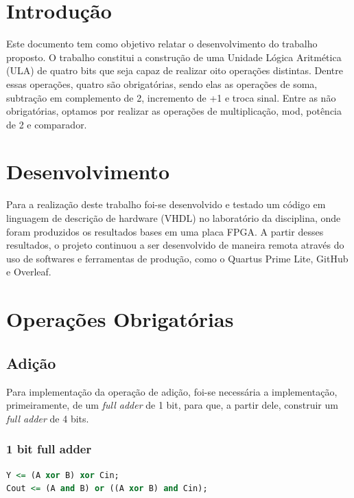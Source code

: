 \documentclass[a4paper, 12pt]{article}
\begin{document}
\newpage
{}

\section{Introdução}

Este documento tem como objetivo relatar o desenvolvimento do trabalho proposto. O trabalho constitui a construção de uma Unidade Lógica Aritmética (ULA) de quatro bits que seja capaz de realizar oito operações distintas. Dentre essas operações, quatro são obrigatórias, sendo elas as operações de soma, subtração em complemento de 2, incremento de +1 e troca sinal. Entre as não obrigatórias, optamos por realizar as operações de multiplicação, mod, potência de 2 e comparador.
\section{Desenvolvimento}

Para a realização deste trabalho foi-se desenvolvido e testado um código em linguagem de descrição de hardware (VHDL) no laboratório da disciplina, onde foram produzidos os resultados bases em uma placa FPGA. A partir desses resultados, o projeto continuou a ser desenvolvido de maneira remota através do uso de softwares e ferramentas de produção, como o Quartus Prime Lite, GitHub e Overleaf. 

\section{Operações Obrigatórias}


\subsection{Adição}


Para implementação da operação de adição, foi-se necessária a implementação, primeiramente, de um \textit{full adder} de 1 bit, para que, a partir dele, construir um \textit{full adder} de 4 bits.

\subsubsection{1 bit full adder}

\begin{lstlisting}[language=VHDL]
Y <= (A xor B) xor Cin;
Cout <= (A and B) or ((A xor B) and Cin);
\end{lstlisting}
\end{document}
